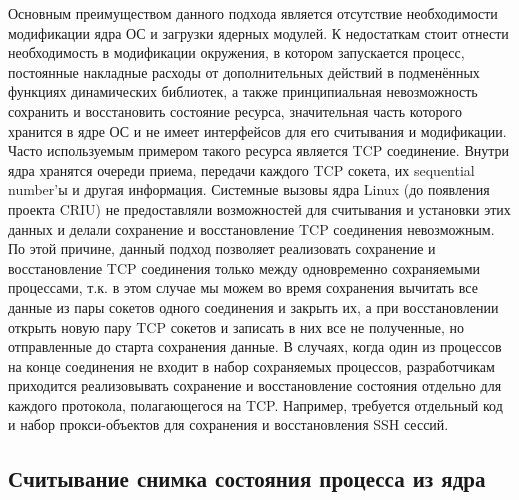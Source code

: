 Основным преимуществом данного подхода является отсутствие необходимости модификации ядра ОС и загрузки ядерных модулей. К недостаткам стоит отнести необходимость в модификации окружения, в котором запускается процесс, постоянные накладные расходы от дополнительных действий в подменённых функциях динамических библиотек, а также принципиальная невозможность сохранить и восстановить состояние ресурса, значительная часть которого хранится в ядре ОС и не имеет интерфейсов для его считывания и модификации. Часто используемым примером такого ресурса является TCP соединение. Внутри ядра хранятся очереди приема, передачи каждого TCP сокета, их sequential number’ы  и другая информация. Системные вызовы ядра Linux (до появления проекта CRIU) не предоставляли возможностей для считывания и установки этих данных и делали сохранение и восстановление TCP соединения невозможным. По этой причине, данный подход позволяет реализовать сохранение и восстановление TCP соединения только между одновременно сохраняемыми процессами, т.к. в этом случае мы можем во время сохранения вычитать все данные из пары сокетов одного соединения и закрыть их, а при восстановлении открыть новую пару TCP сокетов и записать в них все не полученные, но отправленные до старта сохранения данные. В случаях, когда один из процессов на конце соединения не входит в набор сохраняемых процессов, разработчикам приходится реализовывать сохранение и восстановление состояния отдельно для каждого протокола, полагающегося на TCP. Например, требуется отдельный код и набор прокси-объектов для сохранения и восстановления SSH сессий.
 
\subsection{Считывание снимка состояния процесса из ядра}
 
